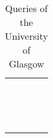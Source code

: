 \begin{longtable}{|l|l|c|}
\hline  &  &  \\
\hline  &  &  \\
\hline  &  &  \\
\hline  &  &  \\
\hline  &  &  \\
\hline  &  &  \\
\hline  &  &  \\
\hline  &  &  \\
\hline  &  &  \\
\hline  &  &  \\
\hline  &  &  \\
\hline  &  &  \\
\hline  &  &  \\
\hline  &  &  \\
\hline  &  &  \\



\hline

\caption{Queries of the University of Glasgow} \label{table:relevanceJudgements}
\end{longtable}
\normalsize
